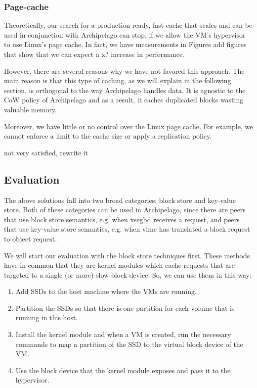 \subsubsection{Page-cache}

Theoretically, our search for a production-ready, fast cache that scales and 
can be used in conjunction with Archipelago can stop, if we allow the VM's 
hypervisor to use Linux's page cache. In fact, we have measurements in Figures 
\fixme add figures that show that we can expect a x? increase in 
performance.

However, there are several reasons why we have not favored this approach. The 
main reason is that this type of caching, as we will explain in the following 
section, is orthogonal to the way Archipelago handles data. It is agnostic to 
the CoW policy of Archipelago and as a result, it caches duplicated blocks 
wasting valuable memory.

Moreover, we have little or no control over the Linux page cache. For example, 
we cannot enforce a limit to the cache size or apply a replication policy.

\todo not very satisfied, rewrite it

\subsection{Evaluation}

The above solutions fall into two broad categories; block store and key-value 
store. Both of these categories can be used in Archipelago, since there are 
peers that use block store semantics, e.g.  when xsegbd receives a request, and 
peers that use key-value store semantics, e.g.  when vlmc has translated a 
block request to object request.

We will start our evaluation with the block store techniques first. These 
methods have in common that they are kernel modules which cache requests that 
are targeted to a single (or more) slow block device. So, we can use them in 
this way:

\begin{enumerate}
	\item Add SSDs to the host machine where the VMs are running.
	\item Partition the SSDs so that there is one partition for each volume 
		that is running in this host.
	\item Install the kernel module and when a VM is created, run the necessary 
		commands to map a partition of the SSD to the virtual block device of 
		the VM.
	\item Use the block device that the kernel module exposes and pass it to 
		the hypervisor.
\end{enumerate}

